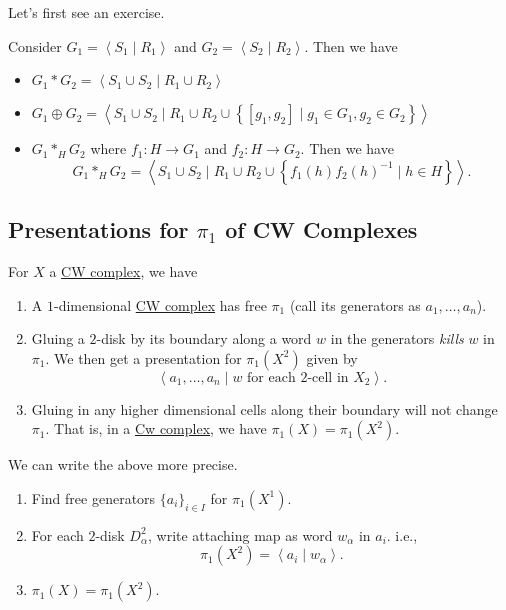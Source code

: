 Let's first see an exercise.
\begin{exercise}
	Consider \(G_1 = \left< S_1 \mid R_1 \right> \) and \(G_2 = \left< S_2 \mid R_2 \right> \). Then we have
	\begin{itemize}
		\item \(G_1\ast G_2 = \left< S_{1}\cup S_2  \mid R_1 \cup R_2 \right> \)
		\item \(G_1\oplus G_2 = \left< S_1 \cup S_2  \mid R_1 \cup R_2\cup \left\{[g_1, g_2] \mid g_1\in G_1, g_2\in G_2\right\} \right> \)
		\item \(G_1 \ast_H G_2 \) where \(f_1\colon H\to G_1\) and \(f_2\colon H\to G_2\). Then we have
		      \[
			      G_1\ast_H G_2 = \left< S_1 \cup S_2  \mid R_1 \cup  R_2\cup \left\{f_1(h)f_2(h)^{-1}  \mid h\in H\right\} \right>.
		      \]
	\end{itemize}
\end{exercise}

\subsection{Presentations for \(\pi _1\) of CW Complexes}
For \(X\) a \hyperref[def:CW-Complex]{CW complex}, we have
\begin{enumerate}
	\item A \(1\)-dimensional \hyperref[def:CW-Complex]{CW complex} has free \(\pi _1\) (call its generators as \(a_1, \ldots , a_n \)).
	\item Gluing a \(2\)-disk by its boundary along a word \(w\) in the generators \emph{kills} \(w\) in \(\pi _1\). We then get a presentation for \(\pi _1(X^2)\)
	      given by
	      \[
		      \left< a_1, \ldots , a_n \mid w \text{ for each \(2\)-cell in \(X_2\)}\right>.
	      \]
	\item Gluing in any higher dimensional cells along their boundary will not change \(\pi _1\). That is, in a \hyperref[def:CW-Complex]{Cw complex},
	      we have \(\pi _1(X) = \pi _1(X^2)\).
\end{enumerate}

\begin{remark}
	We can write the above more precise.
	\begin{enumerate}
		\item Find free generators \(\{a _i\}_{i\in I}\) for \(\pi _1(X^1)\).
		\item For each \(2\)-disk \(D^2_\alpha \), write attaching map as word \(w_\alpha \) in \(a_{i}\). i.e.,
		      \[
			      \pi _1(X^2) = \left< a_{i} \mid w_\alpha  \right>.
		      \]
		\item \(\pi_1(X) = \pi _1(X^2)\).
	\end{enumerate}
\end{remark}

